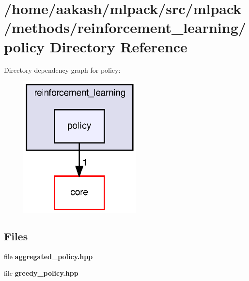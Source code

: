 \section{/home/aakash/mlpack/src/mlpack/methods/reinforcement\+\_\+learning/policy Directory Reference}
\label{dir_b1f2ea9042ebeee045a540d12f8d2768}
Directory dependency graph for policy\+:
\nopagebreak
\begin{figure}[H]
\begin{center}
\leavevmode
\includegraphics[width=175pt]{dir_b1f2ea9042ebeee045a540d12f8d2768_dep}
\end{center}
\end{figure}
\subsection*{Files}
\begin{DoxyCompactItemize}
\item 
file \textbf{ aggregated\+\_\+policy.\+hpp}
\item 
file \textbf{ greedy\+\_\+policy.\+hpp}
\end{DoxyCompactItemize}
